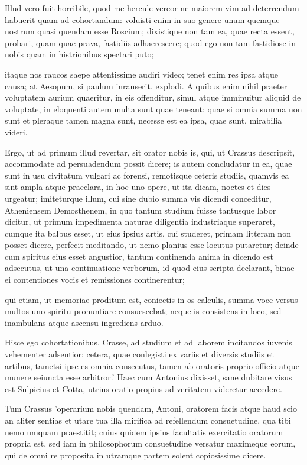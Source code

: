  Illud vero fuit horribile, quod me hercule vereor ne maiorem vim ad deterrendum habuerit quam ad cohortandum: voluisti enim in suo genere unum quemque nostrum quasi quendam esse Roscium; dixistique non tam ea, quae recta essent, probari, quam quae prava, fastidiis adhaerescere; quod ego non tam fastidiose in nobis quam in histrionibus spectari puto;

 itaque nos raucos saepe attentissime audiri video; tenet enim res ipsa atque causa; at Aesopum, si paulum inrauserit, explodi. A quibus enim nihil praeter voluptatem aurium quaeritur, in eis offenditur, simul atque imminuitur aliquid de voluptate, in eloquenti autem multa sunt quae teneant; quae si omnia summa non sunt et pleraque tamen magna sunt, necesse est ea ipsa, quae sunt, mirabilia videri.

 Ergo, ut ad primum illud revertar, sit orator nobis is, qui, ut Crassus descripsit, accommodate ad persuadendum possit dicere; is autem concludatur in ea, quae sunt in usu civitatum vulgari ac forensi, remotisque ceteris studiis, quamvis ea sint ampla atque praeclara, in hoc uno opere, ut ita dicam, noctes et dies urgeatur; imiteturque illum, cui sine dubio summa vis dicendi conceditur, Atheniensem Demosthenem, in quo tantum studium fuisse tantusque labor dicitur, ut primum impedimenta naturae diligentia industriaque superaret, cumque ita balbus esset, ut eius ipsius artis, cui studeret, primam litteram non posset dicere, perfecit meditando, ut nemo planius esse locutus putaretur; deinde cum spiritus eius esset angustior, tantum continenda anima in dicendo est adsecutus, ut una continuatione verborum, id quod eius scripta declarant, binae ei contentiones vocis et remissiones continerentur;

 qui etiam, ut memoriae proditum est, coniectis in os calculis, summa voce versus multos uno spiritu pronuntiare consuescebat; neque is consistens in loco, sed inambulans atque ascensu ingrediens arduo.

 Hisce ego cohortationibus, Crasse, ad studium et ad laborem incitandos iuvenis vehementer adsentior; cetera, quae conlegisti ex variis et diversis studiis et artibus, tametsi ipse es omnia consecutus, tamen ab oratoris proprio officio atque munere seiuncta esse arbitror.' Haec cum Antonius dixisset, sane dubitare visus est Sulpicius et Cotta, utrius oratio propius ad veritatem videretur accedere.

 Tum Crassus 'operarium nobis quendam, Antoni, oratorem facis atque haud scio an aliter sentias et utare tua illa mirifica ad refellendum consuetudine, qua tibi nemo umquam praestitit; cuius quidem ipsius facultatis exercitatio oratorum propria est, sed iam in philosophorum consuetudine versatur maximeque eorum, qui de omni re proposita in utramque partem solent copiosissime dicere.

